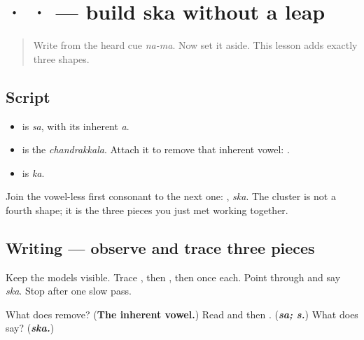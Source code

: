 \section[\texorpdfstring{\ml{സ} \ml{്} \ml{ക} (sa, chandrakkala, ka)}{സ ് ക (sa, chandrakkala, ka)}]{ ·  ·  — build ska without a leap}

\label{lesson:ML-W01-sa-chandrakkala-ka}



\begin{quote}
Write \textbf{} from the heard cue \emph{na-ma}. Now set it aside. This lesson adds exactly three shapes.
\end{quote}

\subsection*{Script}
\begin{itemize}
\raggedright
  \item \textbf{} is \emph{sa}, with its inherent \emph{a}.
  \item \textbf{} is the \emph{chandrakkala}. Attach it to remove that inherent vowel: \textbf{}.
  \item \textbf{} is \emph{ka}.
\end{itemize}

Join the vowel-less first consonant to the next one: \textbf{}, \emph{ska}. The cluster is not a fourth shape; it is the three pieces you just met working together.

\subsection*{Writing — observe and trace three pieces}

Keep the models visible. Trace \textbf{}, then \textbf{}, then \textbf{} once each. Point through \textbf{} and say \emph{ska}. Stop after one slow pass.

\begin{tcolorbox}[breakable,colback=teal!4,colframe=teal!35!black,title={Before you move on}]
What does \textbf{} remove? (\textbf{The inherent vowel.}) Read \textbf{} and then \textbf{}. (\emph{\textbf{sa; s.}}) What does \textbf{} say? (\emph{\textbf{ska.}})
\end{tcolorbox}
